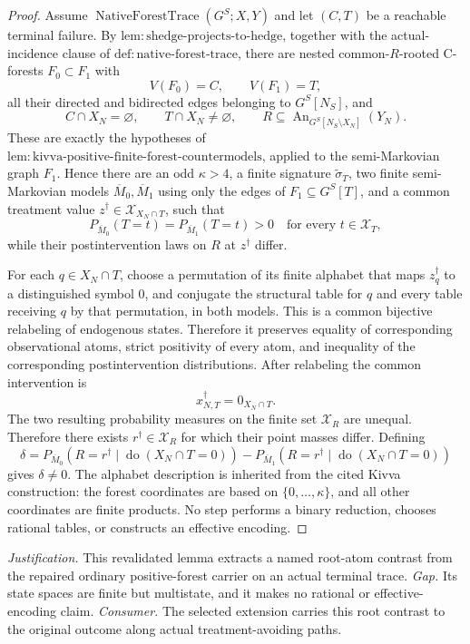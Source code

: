 \documentclass{article}
\begin{document}
\begin{proof}
Assume \(\operatorname{NativeForestTrace}(G^S;X,Y)\) and let \((C,T)\) be a reachable terminal failure. By \(\mathrm{lem:shedge\text{-}projects\text{-}to\text{-}hedge}\), together with the actual-incidence clause of \(\mathrm{def:native\text{-}forest\text{-}trace}\), there are nested common-\(R\)-rooted C-forests \(F_0\subset F_1\) with
\[
 V(F_0)=C,\qquad V(F_1)=T,
\]
all their directed and bidirected edges belonging to \(G^S[N_S]\), and
\[
 C\cap X_N=\varnothing,\qquad
 T\cap X_N\ne\varnothing,\qquad
 R\subseteq\operatorname{An}_{G^S[N_S\setminus X_N]}(Y_N).
\]
These are exactly the hypotheses of \(\mathrm{lem:kivva\text{-}positive\text{-}finite\text{-}forest\text{-}countermodels}\), applied to the semi-Markovian graph \(F_1\). Hence there are an odd \(\kappa>4\), a finite signature \(\widetilde\sigma_T\), two finite semi-Markovian models \(\overline M_0,\overline M_1\) using only the edges of \(F_1\subseteq G^S[T]\), and a common treatment value \(z^\dagger\in\mathcal X_{X_N\cap T}\), such that
\[
 P_{\overline M_0}(T=t)=P_{\overline M_1}(T=t)>0
 \quad\text{for every }t\in\mathcal X_T,
\]
while their postintervention laws on \(R\) at \(z^\dagger\) differ.

For each \(q\in X_N\cap T\), choose a permutation of its finite alphabet that maps \(z_q^\dagger\) to a distinguished symbol \(0\), and conjugate the structural table for \(q\) and every table receiving \(q\) by that permutation, in both models. This is a common bijective relabeling of endogenous states. Therefore it preserves equality of corresponding observational atoms, strict positivity of every atom, and inequality of the corresponding postintervention distributions. After relabeling the common intervention is
\[
 x_{N,T}^\dagger=0_{X_N\cap T}.
\]
The two resulting probability measures on the finite set \(\mathcal X_R\) are unequal. Therefore there exists \(r^\dagger\in\mathcal X_R\) for which their point masses differ. Defining
\[
 \delta=
 P_{\overline M_0}(R=r^\dagger\mid\operatorname{do}(X_N\cap T=0))
 -P_{\overline M_1}(R=r^\dagger\mid\operatorname{do}(X_N\cap T=0))
\]
gives \(\delta\ne0\). The alphabet description is inherited from the cited Kivva construction: the forest coordinates are based on \(\{0,\ldots,\kappa\}\), and all other coordinates are finite products. No step performs a binary reduction, chooses rational tables, or constructs an effective encoding.
\end{proof}
\par\smallskip\noindent \textit{Justification.} This revalidated lemma extracts a named root-atom contrast from the repaired ordinary positive-forest carrier on an actual terminal trace. \textit{Gap.} Its state spaces are finite but multistate, and it makes no rational or effective-encoding claim. \textit{Consumer.} The selected extension carries this root contrast to the original outcome along actual treatment-avoiding paths.
\end{document}

